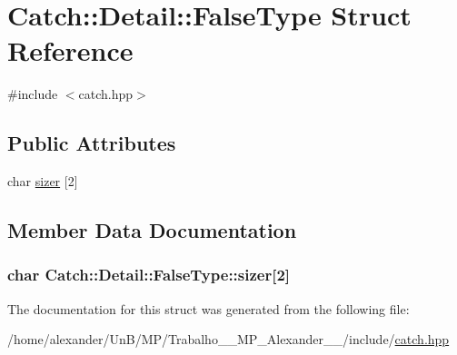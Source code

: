 \hypertarget{structCatch_1_1Detail_1_1FalseType}{\section{Catch\-:\-:Detail\-:\-:False\-Type Struct Reference}
\label{structCatch_1_1Detail_1_1FalseType}
}


{\ttfamily \#include $<$catch.\-hpp$>$}

\subsection*{Public Attributes}
\begin{DoxyCompactItemize}
\item 
char \hyperlink{structCatch_1_1Detail_1_1FalseType_abc1a730e197d6f7750ae8aaf47b63477}{sizer} \mbox{[}2\mbox{]}
\end{DoxyCompactItemize}


\subsection{Member Data Documentation}
\hypertarget{structCatch_1_1Detail_1_1FalseType_abc1a730e197d6f7750ae8aaf47b63477}{
\subsubsection[{sizer}]{\setlength{\rightskip}{0pt plus 5cm}char Catch\-::\-Detail\-::\-False\-Type\-::sizer\mbox{[}2\mbox{]}}}\label{structCatch_1_1Detail_1_1FalseType_abc1a730e197d6f7750ae8aaf47b63477}


The documentation for this struct was generated from the following file\-:\begin{DoxyCompactItemize}
\item 
/home/alexander/\-Un\-B/\-M\-P/\-Trabalho\-\_\-\_\-\-M\-P\-\_\-\-Alexander\-\_\-\_/include/\hyperlink{catch_8hpp}{catch.\-hpp}\end{DoxyCompactItemize}
